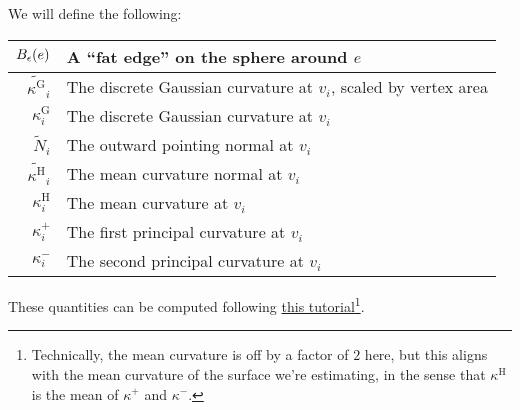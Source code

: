 
We will define the following: \begin{center}\begin{tabular}{r|l}
	\(B_{\epsilon}\pof{e}\) & A ``fat edge'' on the sphere around \(e\) \\ \hline
	\(\widetilde{\kappa^\text{G}}_i\) & The discrete Gaussian curvature at \(v_i\), scaled by vertex area \\ \hline
	\(\kappa^\text{G}_i\) & The discrete Gaussian curvature at \(v_i\) \\ \hline
	\(\widetilde{N}_i\) & The outward pointing normal at \(v_i\) \\ \hline
	\(\widetilde{\kappa^\text{H}}_i\) & The mean curvature normal at \(v_i\) \\ \hline
	\(\kappa^\text{H}_i\) & The mean curvature at \(v_i\) \\ \hline
	\(\kappa^+_i\) & The first principal curvature at \(v_i\) \\ \hline
	\(\kappa^-_i\) & The second principal curvature at \(v_i\)
\end{tabular}\end{center} These quantities can be computed following \href{https://libigl.github.io/libigl-python-bindings/tut-chapter1/}{this tutorial}\footnote{Technically, the mean curvature is off by a factor of \(2\) here, but this aligns with the mean curvature of the surface we're estimating, in the sense that \(\kappa^{\text{H}}\) is the mean of \(\kappa^+\) and \(\kappa^-\).}.

